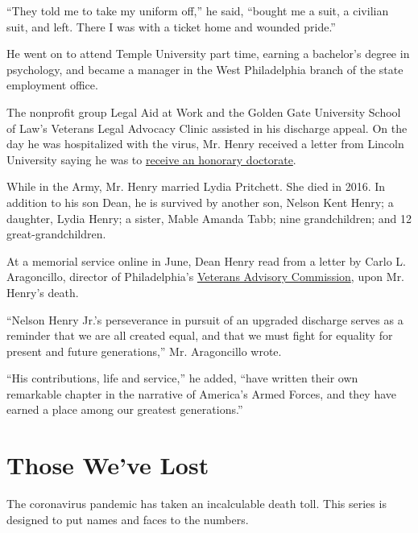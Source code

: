 ``They told me to take my uniform off,'' he said, ``bought me a suit, a
civilian suit, and left. There I was with a ticket home and wounded
pride.''

He went on to attend Temple University part time, earning a bachelor's
degree in psychology, and became a manager in the West Philadelphia
branch of the state employment office.

The nonprofit group Legal Aid at Work and the Golden Gate University
School of Law's Veterans Legal Advocacy Clinic assisted in his discharge
appeal. On the day he was hospitalized with the virus, Mr. Henry
received a letter from Lincoln University saying he was to
\href{https://www.lincoln.edu/news-and-events/news/attorney-ben-crump-speak-receive-honorary-degree-lincoln-university\%E2\%80\%99s-161st}{receive
an honorary doctorate}.

While in the Army, Mr. Henry married Lydia Pritchett. She died in 2016.
In addition to his son Dean, he is survived by another son, Nelson Kent
Henry; a daughter, Lydia Henry; a sister, Mable Amanda Tabb; nine
grandchildren; and 12 great-grandchildren.

At a memorial service online in June, Dean Henry read from a letter by
Carlo L. Aragoncillo, director of Philadelphia's
\href{http://phlcouncil.com/veterans-home/about-vac/}{Veterans Advisory
Commission}, upon Mr. Henry's death.

``Nelson Henry Jr.'s perseverance in pursuit of an upgraded discharge
serves as a reminder that we are all created equal, and that we must
fight for equality for present and future generations,'' Mr. Aragoncillo
wrote.

``His contributions, life and service,'' he added, ``have written their
own remarkable chapter in the narrative of America's Armed Forces, and
they have earned a place among our greatest generations.''

\href{https://www.nytimes3xbfgragh.onion/interactive/2020/obituaries/people-died-coronavirus-obituaries.html?action=click\&pgtype=Article\&state=default\&region=BELOW_MAIN_CONTENT\&context=covid_obits_promo}{}

\hypertarget{those-weve-lost}{%
\section{Those We've Lost}\label{those-weve-lost}}

The coronavirus pandemic has taken an incalculable death toll. This
series is designed to put names and faces to the numbers.

